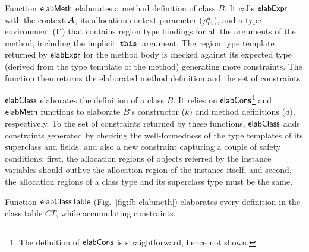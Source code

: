 Function ${\sf elabMeth}$ elaborates a method definition of class $B$. It
calls ${\sf elabExpr}$ with the context ${\mathcal{A}}$, its allocation context
parameter ($\rho^a_m$), and a type environment ($\Gamma$) that
contains region type bindings for all the arguments of the method,
including the implicit $\,{\tt this}\,$ argument. The region type template
returned by ${\sf elabExpr}$ for the method body is checked against its
expected type (derived from the type template of the method)
generating more constraints. The function then returns the elaborated
method definition and the set of constraints.

${\sf elabClass}$ elaborates the definition of a class $B$. It relies on
${\sf elabCons}$\footnote{The definition of ${\sf elabCons}$ is straightforward,
hence not shown.} and ${\sf elabMeth}$ functions to elaborate $B$'s
constructor ($k$) and method definitions ($\bar{d}$), respectively. To
the set of constraints returned by these functions, ${\sf elabClass}$ adds
constraints generated by checking the well-formedness of the type
templates of its superclass and fields, and also a new constraint
capturing a couple of safety conditions: first, the allocation regions
of objects referred by the instance variables should outlive the
allocation region of the instance itself, and second, the allocation
regions of a class type and its superclass type must be the same.

Function ${\sf elabClassTable}$ (Fig.~\ref{fig:fb-elabmeth}) elaborates
every definition in the class table $CT$, while accumulating
constraints.
